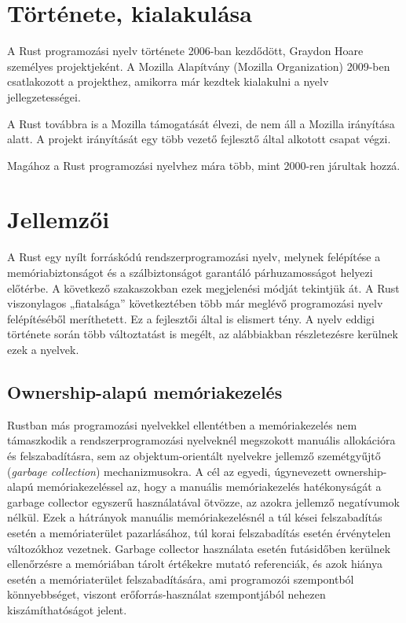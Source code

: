 
\section{Története, kialakulása}

A Rust programozási nyelv története 2006-ban kezdődött, Graydon Hoare személyes projektjeként. A Mozilla Alapítvány (Mozilla Organization) 2009-ben csatlakozott a projekthez, amikorra már kezdtek kialakulni a nyelv jellegzetességei.

A Rust továbbra is a Mozilla támogatását élvezi, de nem áll a Mozilla irányítása alatt. A projekt irányítását egy több vezető fejlesztő által alkotott csapat végzi.

Magához a Rust programozási nyelvhez mára több, mint 2000-ren járultak hozzá.

\section{Jellemzői}

A Rust egy nyílt forráskódú rendszerprogramozási nyelv, melynek felépítése a memóriabiztonságot és a szálbiztonságot garantáló párhuzamosságot helyezi előtérbe. A következő szakaszokban ezek megjelenési módját tekintjük át. A Rust viszonylagos „fiatalsága” következtében több már meglévő programozási nyelv felépítéséből meríthetett. Ez a fejlesztői által is elismert tény. A nyelv eddigi története során több változtatást is megélt, az alábbiakban részletezésre kerülnek ezek a nyelvek.
 
\subsection{Ownership-alapú memóriakezelés}

Rustban más programozási nyelvekkel ellentétben a memóriakezelés nem támaszkodik a rendszerprogramozási nyelveknél megszokott manuális allokációra és felszabadításra, sem az objektum-orientált nyelvekre jellemző szemétgyűjtő (\textit{garbage collection}) mechanizmusokra. A cél az egyedi, úgynevezett ownership-alapú memóriakezeléssel az, hogy a manuális memóriakezelés hatékonyságát a garbage collector egyszerű használatával ötvözze, az azokra jellemző negatívumok nélkül. Ezek a hátrányok manuális memóriakezelésnél a túl kései felszabadítás esetén a memóriaterület pazarlásához, túl korai felszabadítás esetén érvénytelen változókhoz vezetnek. Garbage collector használata esetén futásidőben kerülnek ellenőrzésre a memóriában tárolt értékekre mutató referenciák, és azok hiánya esetén a memóriaterület felszabadítására, ami programozói szempontból könnyebbséget, viszont erőforrás-használat szempontjából nehezen kiszámíthatóságot jelent.

